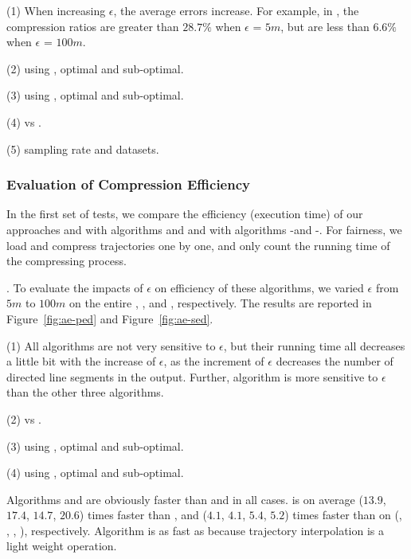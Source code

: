 \sstab (1) When increasing $\epsilon$, the average errors increase. For example, in \ucar,
the compression ratios are greater than $28.7\%$ when $\epsilon$ = $5m$, but are less than $6.6\%$ when $\epsilon$ = $100m$.

\sstab (2) using \ped, optimal and sub-optimal.

\sstab (3) using \sed, optimal and sub-optimal.

\sstab (4) \ped vs \sed.

\sstab (5) sampling rate and datasets.



\subsubsection{Evaluation of Compression Efficiency}



In the first set of tests, we compare the efficiency (execution time) of our approaches \operb and \operba with algorithms \dpa and \fbqsa
and with algorithms -\operb and -\operba.
For fairness, we load and compress trajectories one by one, and only count the running time of the compressing process.


.
To evaluate the impacts of $\epsilon$ on efficiency of these algorithms, we varied $\epsilon$ from $5m$ to $100m$ on the entire \taxi, \truck, \ucar and \geolife, respectively.
The results are reported in Figure~\ref{fig:ae-ped} and Figure~\ref{fig:ae-sed}.

\sstab (1) 
All algorithms are not very sensitive to $\epsilon$, but their running time all decreases a little bit with the increase of $\epsilon$,
as the increment of $\epsilon$ decreases the number of directed line segments in the output.
Further, algorithm \dpa is more sensitive to $\epsilon$ than the other three algorithms.

\sstab (2) \ped vs \sed.

\sstab (3) using \ped, optimal and sub-optimal.

\sstab (4) using \sed, optimal and sub-optimal.

Algorithms \operb and \operba are obviously faster than \dpa and \fbqsa in all cases.
\operb is on average ($13.9$, $17.4$, $14.7$, {$20.6$}) times faster than \dpa, and ($4.1$, $4.1$, $5.4$, {$5.2$}) times faster than \fbqsa on (\taxi, \truck, \ucar, {\geolife}), respectively. Algorithm \operba is as fast as \operb because trajectory interpolation is a light weight operation.

